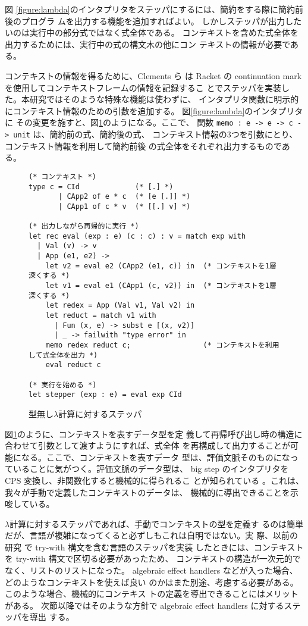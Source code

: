 図 \ref{figure:lambda}のインタプリタをステッパにするには、簡約をする際に簡約前後のプログラ
ムを出力する機能を追加すればよい。
しかしステッパが出力したいのは実行中の部分式ではなく式全体である。
コンテキストを含めた式全体を出力するためには、実行中の式の構文木の他にコン
テキストの情報が必要である。

コンテキストの情報を得るために、Clements ら\cite{clements01} は Racket
の continuation mark を使用してコンテキストフレームの情報を記録するこ
とでステッパを実装した。本研究ではそのような特殊な機能は使わずに、
インタプリタ関数に明示的にコンテキスト情報のための引数を追加する。
図\ref{figure:lambda}のインタプリタに
その変更を施すと、図\ref{figure:lambda_stepper}のようになる。ここで、
関数 \texttt{memo :\ e -> e -> c -> unit} は、簡約前の式、簡約後の式、
コンテキスト情報の3つを引数にとり、コンテキスト情報を利用して簡約前後
の式全体をそれぞれ出力するものである。

\begin{figure}
\begin{spacing}{0.9}
\begin{verbatim}
(* コンテキスト *)
type c = CId             (* [.] *)
       | CApp2 of e * c  (* [e [.]] *)
       | CApp1 of c * v  (* [[.] v] *)

(* 出力しながら再帰的に実行 *)
let rec eval (exp : e) (c : c) : v = match exp with
  | Val (v) -> v
  | App (e1, e2) ->
    let v2 = eval e2 (CApp2 (e1, c)) in  (* コンテキストを1層深くする *)
    let v1 = eval e1 (CApp1 (c, v2)) in  (* コンテキストを1層深くする *)
    let redex = App (Val v1, Val v2) in
    let reduct = match v1 with
      | Fun (x, e) -> subst e [(x, v2)]
      | _ -> failwith "type error" in
    memo redex reduct c;                 (* コンテキストを利用して式全体を出力 *)
    eval reduct c

(* 実行を始める *)
let stepper (exp : e) = eval exp CId
\end{verbatim}
\caption{型無し$\lambda$計算に対するステッパ}
\label{figure:lambda_stepper}
\end{spacing}
\end{figure}

図\ref{figure:lambda_stepper}のように、コンテキストを表すデータ型を定
義して再帰呼び出し時の構造に合わせて引数として渡すようにすれば、式全体
を再構成して出力することが可能になる。ここで、コンテキストを表すデータ
型は、評価文脈そのものになっていることに気がつく。評価文脈のデータ型は、
big step のインタプリタを CPS 変換し、非関数化すると機械的に得られるこ
とが知られている \cite{AK2010, 10.1145/1411204.1411206}。これは、我々が手動で定義したコンテキストのデータは、
機械的に導出できることを示唆している。

$\lambda$計算に対するステッパであれば、手動でコンテキストの型を定義す
るのは簡単だが、言語が複雑になってくると必ずしもこれは自明ではない。実
際、以前の研究 \cite{FCA19} で try-with 構文を含む言語のステッパを実装
したときには、コンテキストを try-with 構文で区切る必要があったため、
コンテキストの構造が一次元的でなく、リストのリストになった。
algebraic effect handlers などが入った場合、どのようなコンテキストを使えば良い
のかはまた別途、考慮する必要がある。このような場合、機械的にコンテキス
トの定義を導出できることにはメリットがある。
次節以降ではそのような方針で algebraic effect handlers に対するステッパを導出
する。
